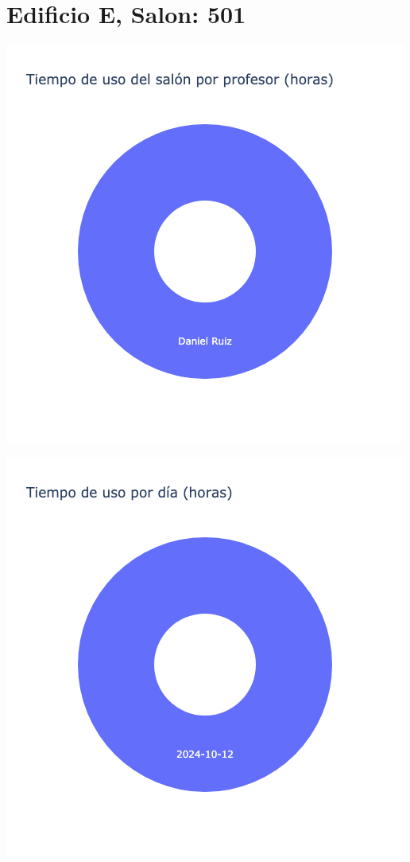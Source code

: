 \documentclass{article}
\begin{document}
    \section{Edificio E, Salon: 501}
    \noindent
    \begin{minipage}{0.48\textwidth}
        \centering
        \includegraphics[width=\textwidth]{../img/pie/UP501-90Dias-03-12-2024.png}
    \end{minipage}
    \hfill
    \begin{minipage}{0.48\textwidth}
        \centering
        \includegraphics[width=\textwidth]{../img/pie/UD501-90Dias-03-12-2024.png}
    \end{minipage}
    
\end{document}

